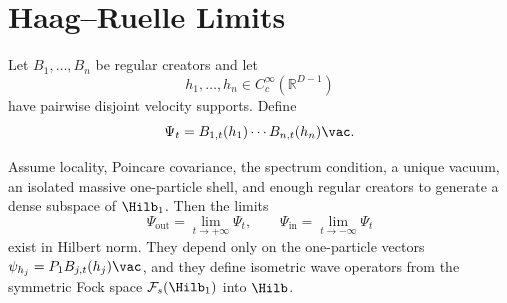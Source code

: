 \section{Haag--Ruelle Limits}

Let \(B_1,\ldots,B_n\) be regular creators and let
\[
  h_1,\ldots,h_n\in C_c^\infty(\mathbb R^{D-1})
\]
have pairwise disjoint velocity supports.  Define
\[
  \Psi_t=
  B_{1,t}(h_1)\cdots B_{n,t}(h_n)\vac .
\]

\begin{theorem}
\label{thm:algebraic-haag-ruelle-scattering}
Assume locality, Poincare covariance, the spectrum condition, a unique
vacuum, an isolated massive one-particle shell, and enough regular creators
to generate a dense subspace of \(\Hilb_1\).  Then the limits
\[
  \Psi_{\mathrm{out}}=\lim_{t\to+\infty}\Psi_t,
  \qquad
  \Psi_{\mathrm{in}}=\lim_{t\to-\infty}\Psi_t
\]
exist in Hilbert norm.  They depend only on the one-particle vectors
\(\psi_{h_j}=P_1B_{j,t}(h_j)\vac\), and they define isometric wave
operators from the symmetric Fock space \(\mathcal F_s(\Hilb_1)\) into
\(\Hilb\).
\end{theorem}

